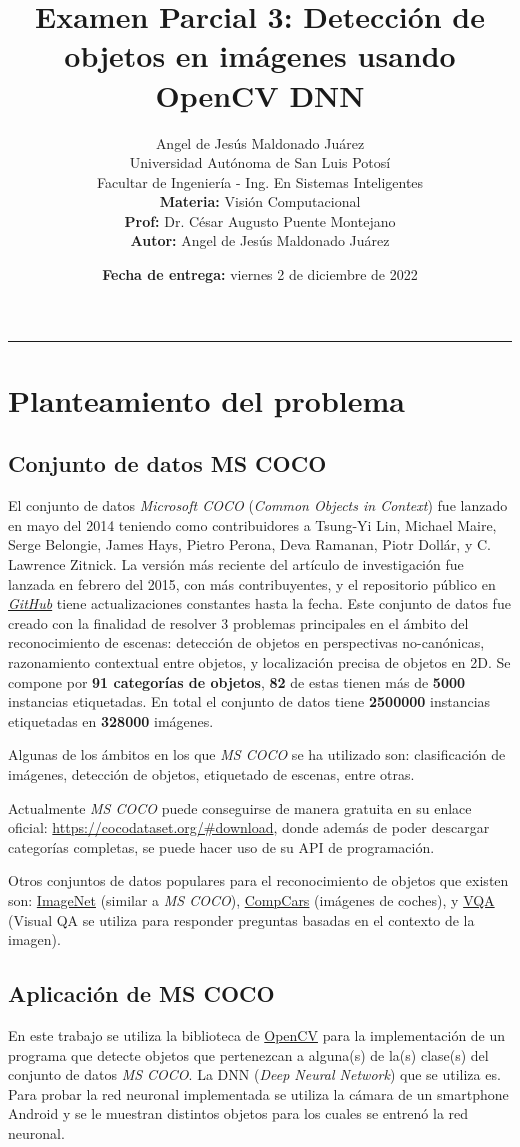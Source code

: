 \documentclass[a4paper, 12pt]{article}
\title{\vspace{-3cm}Examen Parcial 3: Detección de objetos en imágenes usando OpenCV DNN}
\author{
    Angel de Jesús Maldonado Juárez\\
    Universidad Autónoma de San Luis Potosí\\
    Facultar de Ingeniería - Ing. En Sistemas Inteligentes\\
    \textbf{Materia:} Visión Computacional\\
    \textbf{Prof:} Dr. César Augusto Puente Montejano\\
    \textbf{Autor:} Angel de Jesús Maldonado Juárez
}
\date{\textbf{Fecha de entrega:} viernes 2 de diciembre de 2022}
\begin{document}
\maketitle

\hrule

\section{Planteamiento del problema}
\subsection{Conjunto de datos MS COCO}
El conjunto de datos \emph{Microsoft COCO} (\emph{Common Objects in Context}) fue lanzado en mayo del 2014 teniendo como contribuidores a Tsung-Yi Lin, Michael Maire, Serge Belongie, James Hays, Pietro Perona, Deva Ramanan, Piotr Dollár, y C. Lawrence Zitnick. La versión más reciente del artículo de investigación fue lanzada en febrero del 2015, con más contribuyentes, y el repositorio público en \href{https://github.com/cocodataset/cocodataset.github.io}{\emph{GitHub}} tiene actualizaciones constantes hasta la fecha. Este conjunto de datos fue creado con la finalidad de resolver 3 problemas principales en el ámbito del reconocimiento de escenas: detección de objetos en perspectivas no-canónicas, razonamiento contextual entre objetos, y localización precisa de objetos en 2D. Se compone por \textbf{91 categorías de objetos}, \textbf{82} de estas tienen más de \textbf{5000} instancias etiquetadas. En total el conjunto de datos tiene \textbf{2500000} instancias etiquetadas en \textbf{328000} imágenes.

Algunas de los ámbitos en los que \emph{MS COCO} se ha utilizado son: clasificación de imágenes, detección de objetos, etiquetado de escenas, entre otras.

Actualmente \emph{MS COCO} puede conseguirse de manera gratuita en su enlace oficial: \url{https://cocodataset.org/#download}, donde además de poder descargar categorías completas, se puede hacer uso de su API de programación.

Otros conjuntos de datos populares para el reconocimiento de objetos que existen son: \href{https://www.image-net.org/}{ImageNet} (similar a \emph{MS COCO}), \href{http://mmlab.ie.cuhk.edu.hk/datasets/comp_cars/index.html}{CompCars} (imágenes de coches), y \href{https://visualqa.org/}{VQA} (Visual QA se utiliza para responder preguntas basadas en el contexto de la imagen).

\subsection{Aplicación de MS COCO}
En este trabajo se utiliza la biblioteca de \href{https://opencv.org/}{OpenCV} para la implementación de un programa que detecte objetos que pertenezcan a alguna(s) de la(s) clase(s) del conjunto de datos \emph{MS COCO}. La DNN (\emph{Deep Neural Network}) que se utiliza es.
Para probar la red neuronal implementada se utiliza la cámara de un smartphone Android y se le muestran distintos objetos para los cuales se entrenó la red neuronal.
\end{document}
